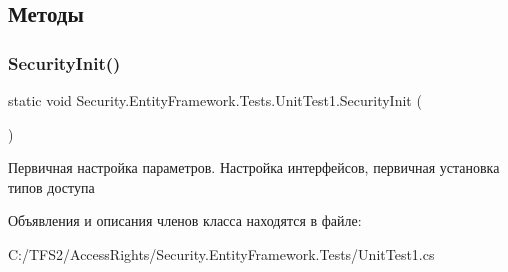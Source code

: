\subsection{Методы}
\mbox{\label{class_security_1_1_entity_framework_1_1_tests_1_1_unit_test1_a1ea4c5d388f351649fae8c82c9318cda}} 
\subsubsection{\texorpdfstring{Security\+Init()}{SecurityInit()}}
{\footnotesize\ttfamily static void Security.\+Entity\+Framework.\+Tests.\+Unit\+Test1.\+Security\+Init (\begin{DoxyParamCaption}{ }\end{DoxyParamCaption})\hspace{0.3cm}{\ttfamily [static]}}



Первичная настройка параметров. Настройка интерфейсов, первичная установка типов доступа 



Объявления и описания членов класса находятся в файле\+:\begin{DoxyCompactItemize}
\item 
C\+:/\+T\+F\+S2/\+Access\+Rights/\+Security.\+Entity\+Framework.\+Tests/Unit\+Test1.\+cs\end{DoxyCompactItemize}
